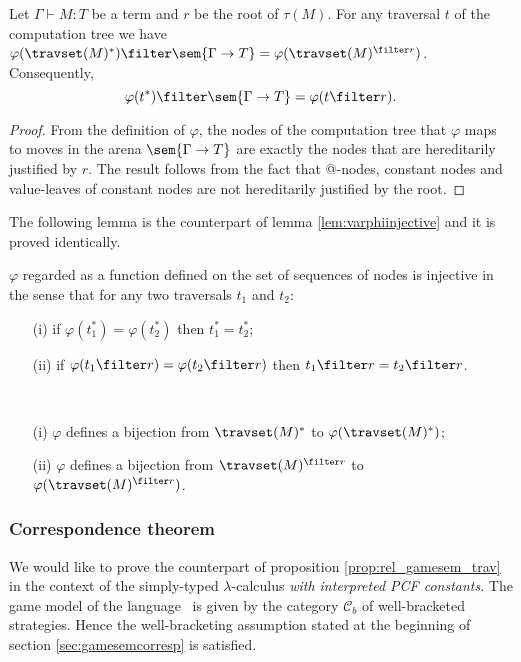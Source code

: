 
\begin{lemma}
\label{lem:SIGMACONST:varphi_filter} Let $\Gamma \vdash M :T$ be a
term and $r$ be the root of $\tau(M)$. For any traversal $t$ of the
computation tree we have $ \varphi(\travset(M)^*) \filter
\sem{\Gamma \rightarrow T} = \varphi(\travset(M)^{\filter r}) $.
 Consequently,
$$\varphi(t^*) \filter \sem{\Gamma \rightarrow T} = \varphi(t\filter r).$$
\end{lemma}
\begin{proof}
    From the definition of $\varphi$, the nodes of the computation tree that $\varphi$ maps
    to moves in the arena $\sem{\Gamma \rightarrow T}$ are exactly the nodes that are hereditarily justified by $r$.
    The result follows from the fact that @-nodes, constant nodes and value-leaves of constant nodes
    are not hereditarily justified by the root.
\end{proof}


The following lemma is the counterpart of lemma
\ref{lem:varphiinjective} and it is proved identically.
\begin{lemma}
\label{lem:SIGMACONST:varphiinjective} $\varphi$ regarded as a
function defined on the set of sequences of nodes is injective in
the sense that for any two traversals $t_1$ and $t_2$:
\begin{itemize}
\item[(i)] if $\varphi (t_1^* ) = \varphi (t_2^* )$ then $t_1^* =t_2^*$;
\item[(ii)] if $\varphi (t_1 \filter r ) = \varphi (t_2 \filter r )$ then $t_1\filter r = t_2\filter r$.
\end{itemize}
\end{lemma}

\begin{corollary} \
\label{cor:SIGMACONST:varphi_bij}
\begin{itemize}
\item[(i)] $\varphi$ defines a bijection from $\travset(M)^*$
to $\varphi(\travset(M)^*)$;
\item[(ii)] $\varphi$ defines a bijection from $\travset(M)^{\filter r}$ to
$\varphi(\travset(M)^{\filter r})$.
\end{itemize}
\end{corollary}


\subsubsection{Correspondence theorem}
We would like to prove the counterpart of proposition
\ref{prop:rel_gamesem_trav} in the context of the simply-typed
$\lambda$-calculus \emph{with interpreted PCF constants}. The game
model of the language \pcf\ is given by the category $\mathcal{C}_b$
of well-bracketed strategies. Hence the well-bracketing assumption
stated at the beginning of section \ref{sec:gamesemcorresp} is
satisfied.

